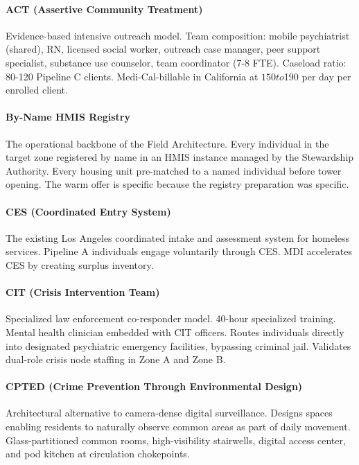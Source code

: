 {\paragraph{ACT (Assertive Community Treatment)} Evidence-based intensive outreach model. Team composition: mobile psychiatrist (shared), RN, licensed social worker, outreach case manager, peer support specialist, substance use counselor, team coordinator (7-8 FTE). Caseload ratio: 80-120 Pipeline C clients. Medi-Cal-billable in California at $150 to $190 per day per enrolled client.

\paragraph{By-Name HMIS Registry} The operational backbone of the Field Architecture. Every individual in the target zone registered by name in an HMIS instance managed by the Stewardship Authority. Every housing unit pre-matched to a named individual before tower opening. The warm offer is specific because the registry preparation was specific.

\paragraph{CES (Coordinated Entry System)} The existing Los Angeles coordinated intake and assessment system for homeless services. Pipeline A individuals engage voluntarily through CES. MDI accelerates CES by creating surplus inventory.

\paragraph{CIT (Crisis Intervention Team)} Specialized law enforcement co-responder model. 40-hour specialized training. Mental health clinician embedded with CIT officers. Routes individuals directly into designated psychiatric emergency facilities, bypassing criminal jail. Validates dual-role crisis node staffing in Zone A and Zone B.

\paragraph{CPTED (Crime Prevention Through Environmental Design)} Architectural alternative to camera-dense digital surveillance. Designs spaces enabling residents to naturally observe common areas as part of daily movement. Glass-partitioned common rooms, high-visibility stairwells, digital access center, and pod kitchen at circulation chokepoints.

}
